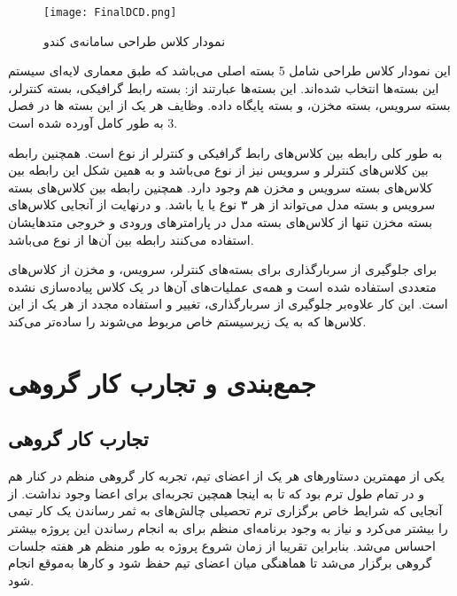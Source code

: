\documentclass{report}
\begin{document}
\begin{figure}[h!]
  \texttt{[image: FinalDCD.png]}
  \caption{نمودار کلاس طراحی سامانه‌ی کندو}
  \label{fig:1}
\end{figure}
\clearpage
این نمودار کلاس طراحی شامل 5 بسته اصلی می‌باشد که طبق معماری لایه‌ای سیستم این بسته‌ها انتخاب شده‌اند. این بسته‌ها عبارتند از: بسته رابط گرافیکی، بسته کنترلر، بسته سرویس، بسته مخزن، و بسته پایگاه داده. وظایف هر یک از این بسته ها در فصل 3 به طور کامل آورده شده است.

به طور کلی رابطه بین کلاس‌های رابط گرافیکی و کنترلر از نوع
 است. همچنین رابطه بین کلاس‌های کنترلر و سرویس نیز از نوع
 می‌باشد و به همین شکل این رابطه بین کلاس‌های بسته سرویس و مخزن هم وجود دارد.
 همچنین رابطه بین کلاس‌های بسته سرویس و بسته مدل می‌تواند از هر ۳ نوع
 یا 
 یا 
 باشد. و درنهایت از آنجایی کلاس‌های بسته مخزن تنها از کلاس‌های بسته مدل در پارامترهای ورودی و خروجی متدهایشان استفاده می‌کنند رابطه بین آن‌ها از نوع 
 می‌باشد.
 
 برای جلوگیری از سربارگذاری 
برای بسته‌های کنترلر، سرویس، و مخزن از کلاس‌های متعددی استفاده شده است و همه‌ی عملیات‌های آن‌ها در یک کلاس پیاده‌سازی نشده است. این کار علاوه‌بر جلوگیری از سربارگذاری، تغییر و استفاده مجدد از هر یک از این کلاس‌ها که به یک زیرسیستم خاص مربوط می‌شوند را ساده‌تر می‌کند.
\chapter{جمع‌بندی و تجارب کار گروهی}

\section{تجارب کار گروهی}
یکی از مهمترین دستاورهای هر یک از اعضای تیم، تجربه کار گروهی منظم در کنار هم و در تمام طول ترم بود که تا به اینجا همچین تجربه‌ای برای اعضا وجود نداشت. از آنجایی که شرایط خاص برگزاری ترم تحصیلی چالش‌های به ثمر رساندن یک کار تیمی را بیشتر می‌کرد و نیاز به وجود برنامه‌ای منظم برای به انجام رساندن این پروژه بیشتر احساس می‌شد. بنابراین تقریبا از زمان شروع پروژه به طور منظم هر هفته جلسات گروهی برگزار می‌شد تا هماهنگی میان اعضای تیم حفظ شود و کارها به‌موقع انجام شود.
\end{document}
